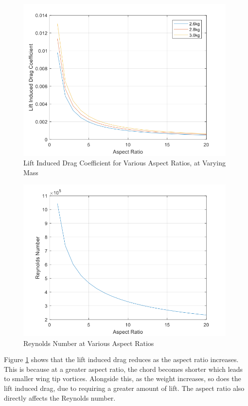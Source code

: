 \documentclass[12pt]{article}
\begin{document}
\begin{figure}[h]
\includegraphics[width=11cm, scale=1]{DragvAR.png}
\centering
\caption{Lift Induced Drag Coefficient for Various Aspect Ratios, at Varying Mass}
\label{fig:DragvAR}
\end{figure}

\begin{figure}[H]
    \includegraphics[width=11cm, scale=1]{ReVAR.png}
    \centering
    \caption{Reynolds Number at Various Aspect Ratios}
    \label{fig:ReVAR}
\end{figure}

\noindent Figure \ref{fig:DragvAR} shows that the lift induced drag reduces as the aspect ratio increases. This is because at a greater aspect ratio, the chord becomes shorter which leads to smaller wing tip vortices. Alongside this, as the weight increases, so does the lift induced drag, due to requiring a greater amount of lift. The aspect ratio also directly affects the Reynolds number. \\
\end{document}
